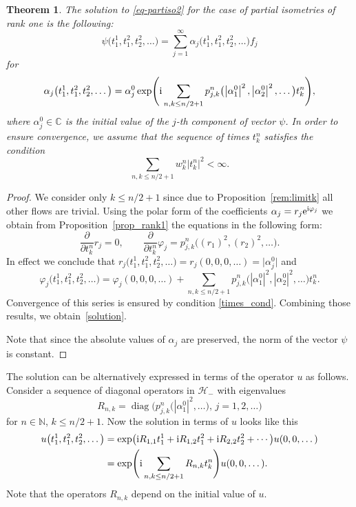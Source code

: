 \documentclass[10pt,a4paper]{amsart}
\newtheorem{thm}{Theorem}[section]
\theoremstyle{definition}
\numberwithin{equation}{section}
\newcommand{\C}{\mathbb C}
\newcommand{\N}{\mathbb N}
\renewcommand{\H}{\mathcal{H}}
\newcommand{\abs}[1]{\left\vert#1\right\vert}
\newcommand{\be}{\begin{equation}}
\newcommand{\ee}{\end{equation}}
\begin{document}
\begin{thm}\label{thm-rank1}
The solution to \eqref{eq-partiso2} for the case of partial isometries of rank one is the following:
\[\psi\bigl(t_1^1,t_1^2,t_2^2,\dots\bigr) = \sum_{j=1}^\infty \alpha_j\bigl(t_1^1,t_1^2,t_2^2,\dots\bigr) f_j\]
for
\begin{equation}\label{solution}
\alpha_j\bigl(t_1^1,t_1^2,t_2^2,\dots\bigr) = \alpha_j^0 \exp\Biggl({{\rm i} \sum_{n,k\leq n/2+1} p_{j,k}^n\bigl(\abs{\alpha_1^0}^2,\abs{\alpha_2^0}^2,\dots\bigr)t^n_k}\Biggr),
\end{equation}
where $\alpha_j^0\in\C$ is the initial value of the $j$-th component of vector $\psi$. In order to ensure convergence, we assume that the sequence of times $t^n_k$ satisfies the condition
\be \label{times_cond} \sum_{n,k\leq n/2+1} w^n_k \abs{t^n_k}^2 < \infty. \ee
\end{thm}

\begin{proof}We consider only $k\leq n/2+1$ since due to Proposition~\ref{rem:limitk} all other flows are trivial.
Using the polar form of the coefficients
$\alpha_j = r_j {\rm e}^{{\rm i}\varphi_j}$
we obtain from Proposition~\ref{prop_rank1} the equations in the following form:
\[
 \frac\partial{\partial t^n_k} r_j = 0 ,\qquad
 \frac\partial{\partial t^n_k} \varphi_j = p_{j,k}^n\bigl((r_1)^2,(r_2)^2,\dots\bigr).
\]
In effect we conclude that
$r_j\bigl(t_1^1,t_1^2,t_2^2,\dots\bigr) = r_j(0, 0, 0, \dots) = \bigl|\alpha_j^0\bigr|$
and
\[\varphi_j\bigl(t_1^1,t_1^2,t_2^2,\dots\bigr)
= \varphi_j(0, 0, 0, \dots) + \sum\limits_{{n,k\leq n/2+1}} p_{j,k}^n\bigl(|\alpha_1^0|^2,|\alpha_2^0|^2,\dots\bigr)t^n_k.\]
Convergence of this series is ensured by condition \eqref{times_cond}.
Combining those results, we obtain~\eqref{solution}.

Note that since the absolute values of $\alpha_j$ are preserved, the norm of the vector $\psi$ is constant.
\end{proof}


The solution can be alternatively expressed in terms of the operator $u$ as follows. Consider a sequence of diagonal operators in $\H_-$ with eigenvalues
\[
R_{n,k}=\operatorname{diag}\bigl(
p_{j,k}^n\bigl(\abs{\alpha_1^0}^2,\dots\bigr),\, j=1,2,\dots\bigr)
\]
for $n\in\N$, $k\leq n/2+1$.
Now the solution in terms of $u$ looks like this
\begin{align*}
u\bigl(t_1^1,t_1^2,t_2^2,\dots\bigr)&= \exp\bigl({\rm i}R_{1,1}{t_1^1}+
{\rm i}R_{1,2}{t_1^2}+{\rm i}R_{2,2}{t_2^2}+\cdots\bigr) u(0,0,\dots)\\
& =\exp\Biggl({{\rm i}\sum\limits_{{n,k\leq n/2+1}} R_{n,k}t^n_k}\Biggr)u(0,0,\dots). \end{align*}
Note that the operators $R_{n,k}$ depend on the initial value of $u$.
\end{document}
